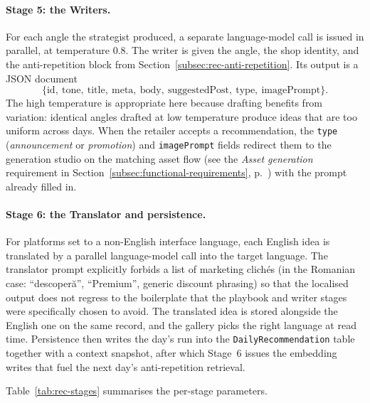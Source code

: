 \paragraph{Stage 5: the Writers.}
For each angle the strategist produced, a separate language-model call is issued in parallel, at temperature $0.8$. The writer is given the angle, the shop identity, and the anti-repetition block from Section~\ref{subsec:rec-anti-repetition}. Its output is a JSON document
\[
\{\text{id},\ \text{tone},\ \text{title},\ \text{meta},\ \text{body},\ \text{suggestedPost},\ \text{type},\ \text{imagePrompt}\}.
\]
The high temperature is appropriate here because drafting benefits from variation: identical angles drafted at low temperature produce ideas that are too uniform across days. When the retailer accepts a recommendation, the \texttt{type} (\emph{announcement} or \emph{promotion}) and \texttt{imagePrompt} fields redirect them to the generation studio on the matching asset flow (see the \emph{Asset generation} requirement in Section~\ref{subsec:functional-requirements}, p.~\pageref{par:asset-generation}) with the prompt already filled in.

\paragraph{Stage 6: the Translator and persistence.}
For platforms set to a non-English interface language, each English idea is translated by a parallel language-model call into the target language. The translator prompt explicitly forbids a list of marketing clich\'es (in the Romanian case: ``descoper\u{a}'', ``Premium'', generic discount phrasing) so that the localised output does not regress to the boilerplate that the playbook and writer stages were specifically chosen to avoid. The translated idea is stored alongside the English one on the same record, and the gallery picks the right language at read time. Persistence then writes the day's run into the \texttt{DailyRecommendation} table together with a context snapshot, after which Stage~6 issues the embedding writes that fuel the next day's anti-repetition retrieval.

Table~\ref{tab:rec-stages} summarises the per-stage parameters.

